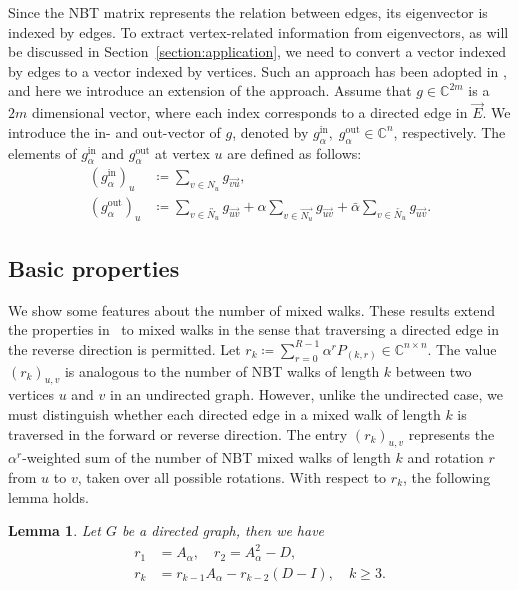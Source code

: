 \documentclass{article}
\theoremstyle{plain}
\newtheorem{lemma}{Lemma}
\begin{document}
Since the NBT matrix represents the relation between edges, its eigenvector is indexed by edges.
To extract vertex-related information from eigenvectors, as will be discussed in Section~\ref{section:application},
we need to convert a vector indexed by edges to a vector indexed by vertices.
Such an approach has been adopted in \citep{Krzakala2013-up,Newman2013-zc}, and here we introduce an extension of the approach.
Assume that $g \in \mathbb{C}^{2m}$ is a $2m$ dimensional vector, where each index corresponds to a directed edge in $\vec{E}$.
We introduce the in- and out-vector of $g$, denoted by $g_{\alpha}^{\text{in}},\; g_{\alpha}^{\text{out}} \in \mathbb{C}^{n}$, respectively. The elements of $g_{\alpha}^{\text{in}}$ and $g_{\alpha}^{\text{out}}$ at vertex $u$ are defined as follows:
\begin{align}
	\left( g_{\alpha}^{\text{in}} \right)_{u}  & \coloneqq
	\sum_{v\in N_{u}} g_{\overrightarrow{vu}}
	,\label{definition:in-vector}                          \\
	\left( g_{\alpha}^{\text{out}} \right)_{u} & \coloneqq
	\sum_{v\in \overleftrightarrow{N_u}} g_{\overrightarrow{uv}}
	+ \alpha \sum_{v \in \overrightarrow{N_u}} g_{\overrightarrow{uv}}
	+ \bar{\alpha} \sum_{v \in \overleftarrow{N_u}} g_{\overrightarrow{uv}}
	.\label{definition:out-vector}
\end{align}

\subsection{Basic properties}

We show some features about the number of mixed walks.
These results extend the properties in~\citep{Stark1996-mx,Tarfulea2009-sy} to mixed walks in the sense that traversing a directed edge in the reverse direction is permitted.
Let $r_k \coloneqq \sum_{r=0}^{R-1} \alpha^r P_{(k,r)} \in \mathbb{C}^{n\times n}$.
The value $(r_k)_{u,v}$ is analogous to the number of NBT walks of length $k$ between two vertices $u$ and $v$ in an undirected graph.
However, unlike the undirected case, we must distinguish whether each directed edge in a mixed walk of length $k$ is traversed in the forward or reverse direction.
The entry $(r_k)_{u,v}$ represents the $\alpha^r$-weighted sum of the number of NBT mixed walks of length $k$ and rotation $r$ from $u$ to $v$, taken over all possible rotations.
With respect to $r_k$, the following lemma holds.
\begin{lemma}\label{lemma:r_k}
	Let $G$ be a directed graph, then we have
	\begin{align*}
		r_1 & = A_{\alpha}
		,\quad
		r_2 = A_{\alpha}^2 - D
		,                                          \\
		r_k & = r_{k-1} A_{\alpha} - r_{k-2} (D-I)
		,\quad k\geq 3
		.
	\end{align*}
\end{lemma}
\end{document}
